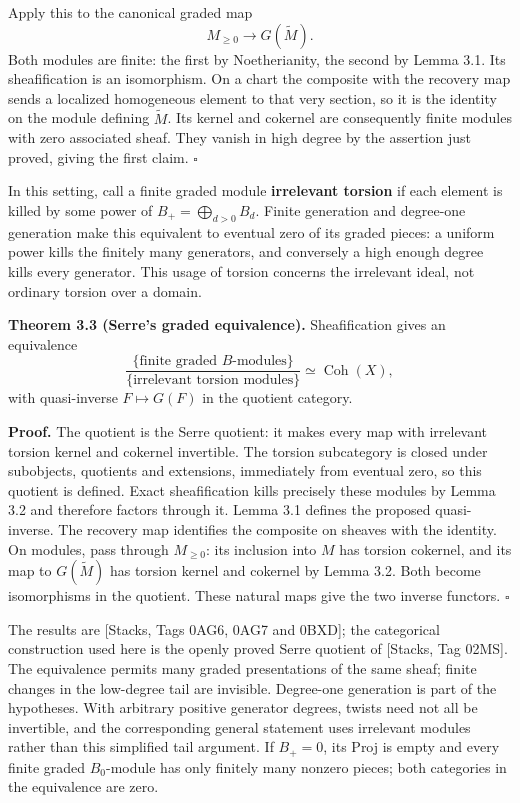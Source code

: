 \documentclass[11pt]{article}
\begin{document}
Apply this to the canonical graded map \[
M_{\ge0}\longrightarrow G(\widetilde M).
\] Both modules are finite: the first by Noetherianity, the second by
Lemma 3.1. Its sheafification is an isomorphism. On a chart the
composite with the recovery map sends a localized homogeneous element to
that very section, so it is the identity on the module defining
\(\widetilde M\). Its kernel and cokernel are consequently finite
modules with zero associated sheaf. They vanish in high degree by the
assertion just proved, giving the first claim. \(\square\)

In this setting, call a finite graded module \textbf{irrelevant torsion}
if each element is killed by some power of \(B_+=\bigoplus_{d>0}B_d\).
Finite generation and degree-one generation make this equivalent to
eventual zero of its graded pieces: a uniform power kills the finitely
many generators, and conversely a high enough degree kills every
generator. This usage of torsion concerns the irrelevant ideal, not
ordinary torsion over a domain.

\textbf{Theorem 3.3 (Serre's graded equivalence).} Sheafification gives
an equivalence \[
\frac{\{\text{finite graded }B\text{-modules}\}}
{\{\text{irrelevant torsion modules}\}}
\simeq\operatorname{Coh}(X),
\] with quasi-inverse \(F\mapsto G(F)\) in the quotient category.

\textbf{Proof.} The quotient is the Serre quotient: it makes every map
with irrelevant torsion kernel and cokernel invertible. The torsion
subcategory is closed under subobjects, quotients and extensions,
immediately from eventual zero, so this quotient is defined. Exact
sheafification kills precisely these modules by Lemma 3.2 and therefore
factors through it. Lemma 3.1 defines the proposed quasi-inverse. The
recovery map identifies the composite on sheaves with the identity. On
modules, pass through \(M_{\ge0}\): its inclusion into \(M\) has torsion
cokernel, and its map to \(G(\widetilde M)\) has torsion kernel and
cokernel by Lemma 3.2. Both become isomorphisms in the quotient. These
natural maps give the two inverse functors. \(\square\)

The results are {[}Stacks, Tags 0AG6, 0AG7 and 0BXD{]}; the categorical
construction used here is the openly proved Serre quotient of {[}Stacks,
Tag 02MS{]}. The equivalence permits many graded presentations of the
same sheaf; finite changes in the low-degree tail are invisible.
Degree-one generation is part of the hypotheses. With arbitrary positive
generator degrees, twists need not all be invertible, and the
corresponding general statement uses irrelevant modules rather than this
simplified tail argument. If \(B_+=0\), its Proj is empty and every
finite graded \(B_0\)-module has only finitely many nonzero pieces; both
categories in the equivalence are zero.
\end{document}
